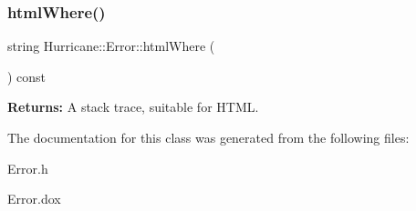 \subsubsection{\texorpdfstring{html\+Where()}{htmlWhere()}}
{\footnotesize\ttfamily string Hurricane\+::\+Error\+::html\+Where (\begin{DoxyParamCaption}{ }\end{DoxyParamCaption}) const\hspace{0.3cm}{\ttfamily [inline]}}

{\bfseries Returns\+:} A stack trace, suitable for H\+T\+ML. 

The documentation for this class was generated from the following files\+:\begin{DoxyCompactItemize}
\item 
Error.\+h\item 
Error.\+dox\end{DoxyCompactItemize}
